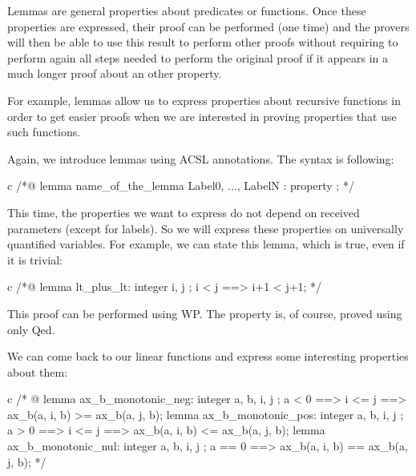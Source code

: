 \documentclass[middle]{zmdocument}
\begin{document}
Lemmas are general properties about predicates or functions. Once these
properties are expressed, their proof can be performed (one time) and
the provers will then be able to use this result to perform other proofs
without requiring to perform again all steps needed to perform the
original proof if it appears in a much longer proof about an other
property.




For example, lemmas allow us to express properties about recursive
functions in order to get easier proofs when we are interested in
proving properties that use such functions.





Again, we introduce lemmas using ACSL annotations. The syntax is
following:



\begin{CodeBlock}{c}
/*@
  lemma name_of_the_lemma { Label0, ..., LabelN }:
    property ;
*/
\end{CodeBlock}



This time, the properties we want to express do not depend on received
parameters (except for labels). So we will express these properties on
universally quantified variables. For example, we can state this lemma,
which is true, even if it is trivial:



\begin{CodeBlock}{c}
/*@
  lemma lt_plus_lt:
    \forall integer i, j ; i < j ==> i+1 < j+1;
*/
\end{CodeBlock}



This proof can be performed using WP. The property is, of course, proved
using only Qed.





We can come back to our linear functions and express some interesting
properties about them:



\begin{CodeBlock}{c}
/* @
  lemma ax_b_monotonic_neg:
    \forall integer a, b, i, j ;
      a <  0 ==> i <= j ==> ax_b(a, i, b) >= ax_b(a, j, b);
  lemma ax_b_monotonic_pos:
    \forall integer a, b, i, j ;
      a >  0 ==> i <= j ==> ax_b(a, i, b) <= ax_b(a, j, b);
  lemma ax_b_monotonic_nul:
    \forall integer a, b, i, j ;
      a == 0 ==> ax_b(a, i, b) == ax_b(a, j, b);
*/
\end{CodeBlock}
\end{document}
